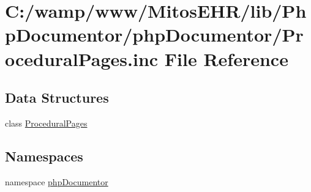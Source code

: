 \hypertarget{_procedural_pages_8inc}{\section{\-C\-:/wamp/www/\-Mitos\-E\-H\-R/lib/\-Php\-Documentor/php\-Documentor/\-Procedural\-Pages.inc \-File \-Reference}
\label{_procedural_pages_8inc}
}
\subsection*{\-Data \-Structures}
\begin{DoxyCompactItemize}
\item 
class \hyperlink{class_procedural_pages}{\-Procedural\-Pages}
\end{DoxyCompactItemize}
\subsection*{\-Namespaces}
\begin{DoxyCompactItemize}
\item 
namespace \hyperlink{namespacephp_documentor}{php\-Documentor}
\end{DoxyCompactItemize}
